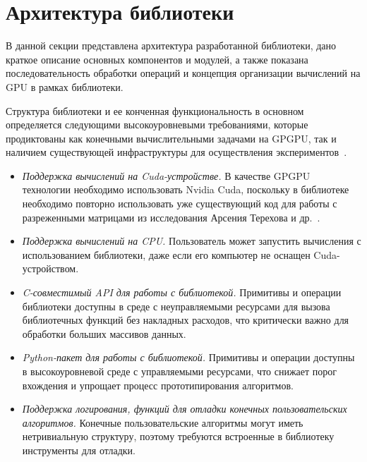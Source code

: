 \section{Архитектура библиотеки}

В данной секции представлена архитектура разработанной библиотеки, дано краткое описание основных компонентов и модулей, а также показана последовательность обработки операций и концепция организации вычислений на GPU в рамках библиотеки.

Структура библиотеки и ее конченная функциональность в основном определяется следующими высокоуровневыми требованиями, которые продиктованы как конечными вычислительными задачами на GPGPU, так и наличием существующей инфраструктуры для осуществления экспериментов~\cite{net:cfpq_py_algo}.

\begin{itemize}[noitemsep,topsep=0pt,parsep=0pt,partopsep=0pt]
    \item \textit{Поддержка вычислений на Cuda-устройстве.} В качестве GPGPU технологии необходимо использовать Nvidia Cuda, поскольку в библиотеке необходимо повторно использовать уже существующий код для работы с разреженными матрицами из исследования Арсения Терехова и др.~\cite{inproceedings:cfqp_matrix_with_single_source}.
    \item \textit{Поддержка вычислений на CPU.} Пользователь может запустить вычисления с использованием библиотеки, даже если его компьютер не оснащен Cuda-устройством.
    \item \textit{C-совместимый API для работы с библиотекой.} Примитивы и операции библиотеки доступны в среде с неуправляемыми ресурсами для вызова библиотечных функций без накладных расходов, что критически важно для обработки больших массивов данных.
    \item \textit{Python-пакет для работы с библиотекой.} Примитивы и операции доступны в высокоуровневой среде с управляемыми ресурсами, что снижает порог вхождения и упрощает процесс прототипирования алгоритмов.
    \item \textit{Поддержка логирования, функций для отладки конечных пользовательских алгоритмов.} Конечные пользовательские алгоритмы могут иметь нетривиальную структуру, поэтому требуются встроенные в библиотеку инструменты для отладки.
\end{itemize}

